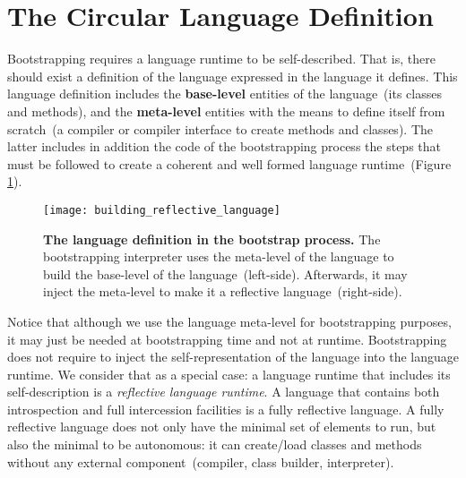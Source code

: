 
\section{The Circular Language Definition}\label{sec:circular_definition}

Bootstrapping requires a language runtime to be self-described. That is, there should exist a definition of the language expressed in the language it defines. This language definition includes the \textbf{base-level} entities of the language~(\eg its classes and methods), and the \textbf{meta-level} entities with the means to define itself from scratch~(\eg a compiler or compiler interface to create methods and classes). The latter includes in addition the code of the bootstrapping process \ie the steps that must be followed to create a coherent and well formed language runtime~(Figure \ref{fig:language_definition}).

\begin{figure}[ht]
\center
\texttt{[image: building\_reflective\_language]}
\caption{\textbf{The language definition in the bootstrap process.} The bootstrapping interpreter uses the meta-level of the language to build the base-level of the language~(left-side). Afterwards, it may inject the meta-level to make it a reflective language~(right-side).\label{fig:language_definition}}
\end{figure}

Notice that although we use the language meta-level for bootstrapping purposes, it may just be needed at bootstrapping time and not at runtime. Bootstrapping does not require to inject the self-representation of the language into the language runtime. We consider that as a special case: a language runtime that includes its self-description is a \emph{reflective language runtime}.
A language that contains both introspection and full intercession facilities is a fully reflective language. A fully reflective language does not only have the minimal set of elements to run, but also the minimal to be autonomous: it can create/load classes and methods without any external component~(compiler, class builder, interpreter).

